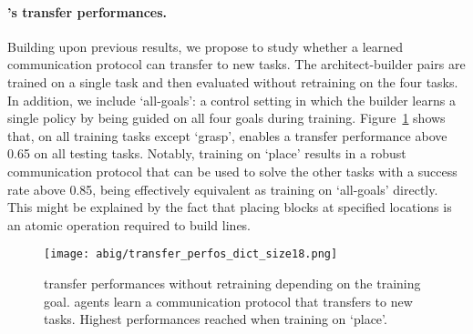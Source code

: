 \paragraph{\abim's transfer performances.}
Building upon previous results, we propose to study whether a learned communication protocol can transfer to new tasks. The architect-builder pairs are trained on a single task and then evaluated without retraining on the four tasks. In addition, we include `all-goals': a control setting in which the builder learns a single policy by being guided on all four goals during training. Figure~\ref{fig:tranfert_performance} shows that, on all training tasks except `grasp', \abig enables a transfer performance above 0.65 on all testing tasks. Notably, training on `place' results in a robust communication protocol that can be used to solve the other tasks with a success rate above 0.85, being effectively equivalent as training on `all-goals' directly. This might be explained by the fact that placing blocks at specified locations is an atomic operation required to build lines.
%
\begin{figure}[!h]
    \centering
    \vspace{-.2cm}
    \texttt{[image: abig/transfer\_perfos\_dict\_size18.png]}
    \vspace{-.3cm}
    \caption{\abim transfer performances without retraining depending on the training goal. \abim agents learn a communication protocol that transfers to new tasks. Highest performances reached when training on `place'.}
    \label{fig:tranfert_performance} 
\end{figure}
%

